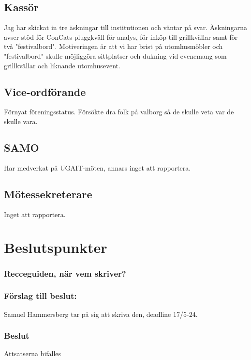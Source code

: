 \documentclass[protokoll]{dvd}
\begin{document}
\subsection{Kassör}
Jag har skickat in tre äskningar till institutionen och väntar på svar. Äskningarna avser stöd för ConCats pluggkväll för analys, för inköp till grillkvällar samt för två "festivalbord". Motiveringen är att vi har brist på utomhusmöbler och "festivalbord" skulle möjliggöra sittplatser och dukning vid evenemang som grillkvällar och liknande utomhusevent.

\subsection{Vice-ordförande}
Förnyat föreningsstatus. Försökte dra folk på valborg så de skulle veta var de skulle vara.

\subsection{SAMO}
Har medverkat på UGAIT-möten, annars inget att rapportera.

\subsection{Mötessekreterare}
Inget att rapportera.


\newpage

\section{Beslutspunkter}

\subsubsection*{Recceguiden, när vem skriver?}

\subsubsection*{Förslag till beslut:}
\begin{attsatser}
    \item Samuel Hammersberg tar på sig att skriva den, deadline 17/5-24.
\end{attsatser}

\subsubsection*{Beslut}
\begin{attsatser}
    \item Attsatserna bifalles
\end{attsatser}
\end{document}
